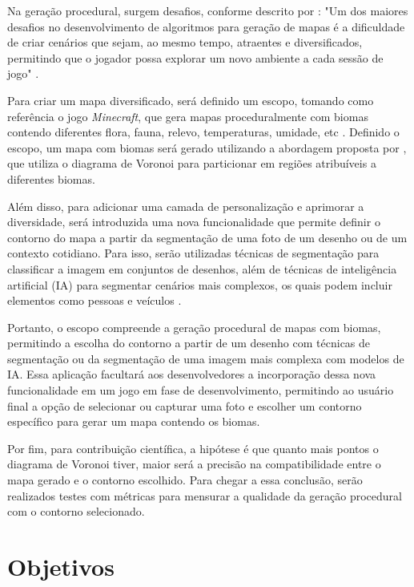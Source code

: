 Na geração procedural, surgem desafios, conforme descrito por : "Um dos maiores desafios no desenvolvimento de algoritmos para geração de mapas é a dificuldade de criar cenários que sejam, ao mesmo tempo, atraentes e diversificados, permitindo que o jogador possa explorar um novo ambiente a cada sessão de jogo" \cite{geracao_procedural_jogos_2d}.

Para criar um mapa diversificado, será definido um escopo, tomando como referência o jogo \textit{Minecraft}, que gera mapas proceduralmente com biomas contendo diferentes flora, fauna, relevo, temperaturas, umidade, etc \cite{mojang}. Definido o escopo, um mapa com biomas será gerado utilizando a abordagem proposta por , que utiliza o diagrama de Voronoi para particionar em regiões atribuíveis a diferentes biomas.

Além disso, para adicionar uma camada de personalização e aprimorar a diversidade, será introduzida uma nova funcionalidade que permite definir o contorno do mapa a partir da segmentação de uma foto de um desenho ou de um contexto cotidiano. Para isso, serão utilizadas técnicas de segmentação para classificar a imagem em conjuntos de desenhos, além de técnicas de inteligência artificial (IA) para segmentar cenários mais complexos, os quais podem incluir elementos como pessoas e veículos  \cite{dp_semantic_segmantation, saiwa}.

Portanto, o escopo compreende a geração procedural de mapas com biomas, permitindo a escolha do contorno a partir de um desenho com técnicas de segmentação ou da segmentação de uma imagem mais complexa com modelos de IA. Essa aplicação facultará aos desenvolvedores a incorporação dessa nova funcionalidade em um jogo em fase de desenvolvimento, permitindo ao usuário final a opção de selecionar ou capturar uma foto e escolher um contorno específico para gerar um mapa contendo os biomas.

Por fim, para contribuição científica, a hipótese é que quanto mais pontos o diagrama de Voronoi tiver, maior será a precisão na compatibilidade entre o mapa gerado e o contorno escolhido. Para chegar a essa conclusão, serão realizados testes com métricas para mensurar a qualidade da geração procedural com o contorno selecionado.

\section{Objetivos}

